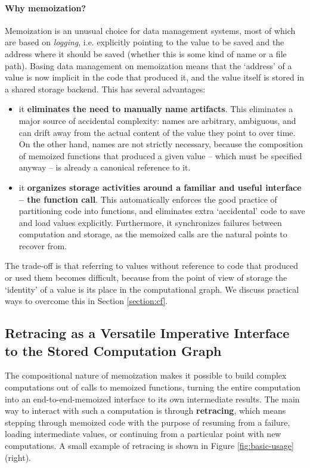 \documentclass{article} %
\begin{document}
\paragraph{Why memoization?} Memoization is an unusual choice for data
management systems, most of which are based on \emph{logging}, i.e. explicitly
pointing to the value to be saved and the address where it should be saved
(whether this is some kind of name or a file path). Basing data management on
memoization means that the `address' of a value is now implicit in the code that
produced it, and the value itself is stored in a shared storage backend. This has several advantages:
\begin{itemize}
\item it \textbf{eliminates the need to manually name artifacts}. This
eliminates a major source of accidental complexity: names are arbitrary,
ambiguous, and can drift away from the actual content of the value they point to
over time. On the other hand, names are not strictly necessary, because the
composition of memoized functions that produced a given value -- which must be specified anyway -- is already a canonical reference to it. 
\item it \textbf{organizes storage activities around a familiar and useful
interface -- the function call}. This automatically enforces the good practice
of partitioning code into functions, and eliminates extra `accidental' code to
save and load values explicitly. Furthermore, it synchronizes failures between
computation and storage, as the memoized calls are the natural points to
recover from.
\end{itemize}

The trade-off is that referring to values without reference to code that
produced or used them becomes difficult, because from the point of view of
storage the `identity' of a value is its place in the computational graph. We
discuss practical ways to overcome this in Section \ref{section:cf}.

\subsection{Retracing as a Versatile Imperative Interface to the Stored Computation Graph}
\label{subsection:retracing}

The compositional nature of memoization makes it possible to build complex
computations out of calls to memoized functions, turning the entire computation
into an end-to-end-memoized interface to its own intermediate results. The main
way to interact with such a computation is through \textbf{retracing}, which
means stepping through memoized code with the purpose of resuming from a
failure, loading intermediate values, or continuing from a particular point with
new computations. A small example of retracing is shown in Figure
\ref{fig:basic-usage} (right). 
\end{document}
